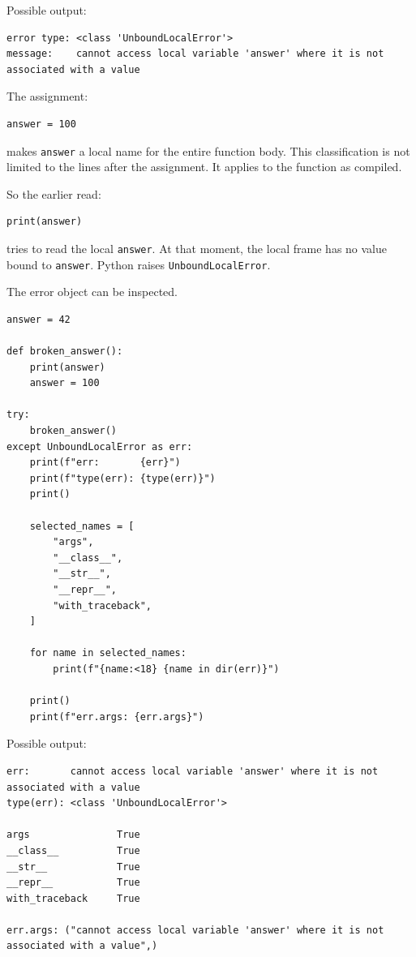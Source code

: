 Possible output:

\begin{verbatim}
error type: <class 'UnboundLocalError'>
message:    cannot access local variable 'answer' where it is not associated with a value
\end{verbatim}

The assignment:

\begin{verbatim}
answer = 100
\end{verbatim}

makes \texttt{answer} a local name for the entire function body. This classification is not limited to the lines after the assignment. It applies to the function as compiled.

So the earlier read:

\begin{verbatim}
print(answer)
\end{verbatim}

tries to read the local \texttt{answer}. At that moment, the local frame has no value bound to \texttt{answer}. Python raises \texttt{UnboundLocalError}.

The error object can be inspected.

\begin{verbatim}
answer = 42

def broken_answer():
    print(answer)
    answer = 100

try:
    broken_answer()
except UnboundLocalError as err:
    print(f"err:       {err}")
    print(f"type(err): {type(err)}")
    print()

    selected_names = [
        "args",
        "__class__",
        "__str__",
        "__repr__",
        "with_traceback",
    ]

    for name in selected_names:
        print(f"{name:<18} {name in dir(err)}")

    print()
    print(f"err.args: {err.args}")
\end{verbatim}

Possible output:

\begin{verbatim}
err:       cannot access local variable 'answer' where it is not associated with a value
type(err): <class 'UnboundLocalError'>

args               True
__class__          True
__str__            True
__repr__           True
with_traceback     True

err.args: ("cannot access local variable 'answer' where it is not associated with a value",)
\end{verbatim}

